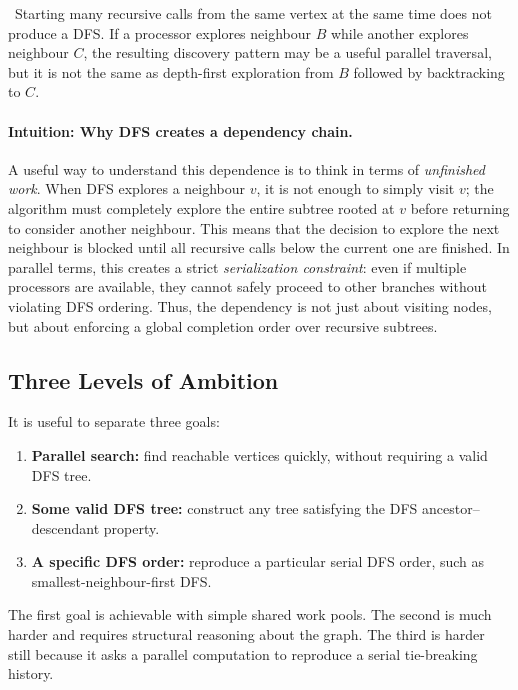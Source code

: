 \begin{pppitfall}
\ Starting many recursive calls from the same vertex at the same time does not produce a DFS.
If a processor explores neighbour \(B\) while another explores neighbour \(C\), the resulting discovery pattern may be a useful parallel traversal, but it is not the same as depth-first exploration from \(B\) followed by backtracking to \(C\).
\end{pppitfall}

\paragraph{Intuition: Why DFS creates a dependency chain.}
A useful way to understand this dependence is to think in terms of \emph{unfinished work}. 
When DFS explores a neighbour \(v\), it is not enough to simply visit \(v\); the algorithm must completely explore the entire subtree rooted at \(v\) before returning to consider another neighbour. 
This means that the decision to explore the next neighbour is blocked until all recursive calls below the current one are finished. 
In parallel terms, this creates a strict \emph{serialization constraint}: even if multiple processors are available, they cannot safely proceed to other branches without violating DFS ordering. 
Thus, the dependency is not just about visiting nodes, but about enforcing a global completion order over recursive subtrees.

\subsection{Three Levels of Ambition}

It is useful to separate three goals:

\begin{enumerate}
    \item \textbf{Parallel search:} find reachable vertices quickly, without requiring a valid DFS tree.
    \item \textbf{Some valid DFS tree:} construct any tree satisfying the DFS ancestor--descendant property.
    \item \textbf{A specific DFS order:} reproduce a particular serial DFS order, such as smallest-neighbour-first DFS.
\end{enumerate}

The first goal is achievable with simple shared work pools.
The second is much harder and requires structural reasoning about the graph.
The third is harder still because it asks a parallel computation to reproduce a serial tie-breaking history.

